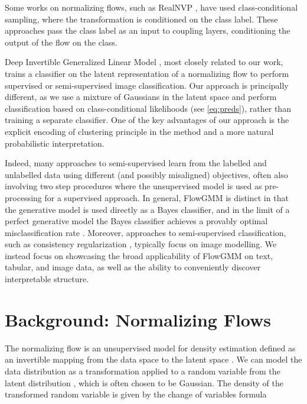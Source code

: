 \documentclass{article}
\newcommand{\method}{FlowGMM\xspace}
\begin{document}
Some works on normalizing flows, such as RealNVP \citep{dinh2016density},
have used class-conditional sampling, where the transformation is conditioned on the class label. These approaches pass the class label as an input to coupling layers, conditioning the output of the flow on the class.

Deep Invertible Generalized Linear Model \citep[DIGLM, ][]{nalisnick2019hybrid}, most closely related to our work, trains a classifier on the latent representation of a normalizing flow
to perform supervised or semi-supervised image 
classification. 
Our approach is principally different, as we
use a mixture of Gaussians in the latent space 
and perform classification based on class-conditional
likelihoods (see \eqref{eq:preds}), rather than training a
separate classifier. 
One of the key advantages of our
approach is the explicit encoding of clustering principle in the method and a more natural probabilistic interpretation.

Indeed, many approaches to semi-supervised learn from the labelled and unlabelled data using different (and possibly misaligned) objectives, often also involving two step procedures where the unsupervised model is used as pre-processing for a supervised approach.
In general, \method is distinct in that the generative model is used directly as a Bayes classifier, and in the limit of a perfect generative model the Bayes classifier achieves a provably optimal misclassification rate \citep[see e.g.][]{mohri2018foundations}. Moreover, approaches to semi-supervised classification, such as consistency regularization \citep{laine2016temporal, miyato2018virtual,tarvainen2017mean, athiwaratkun2018there, verma2019interpolation, berthelot2019mixmatch}, typically focus on image modelling. We instead focus on showcasing the broad applicability of \method on text, tabular, and image data, as well as the ability to conveniently discover interpretable structure.


\section{Background: Normalizing Flows}
\label{sec:background}

The normalizing flow \citep{dinh2016density} is an unsupervised model
for density estimation defined as an invertible mapping 
 from the data space  to the latent space 
.
We can model the data distribution as a transformation 
 applied to a random 
variable from the latent distribution , which is often chosen to be Gaussian.
The density of the transformed random variable  is 
given by the change of variables formula
\end{document}

